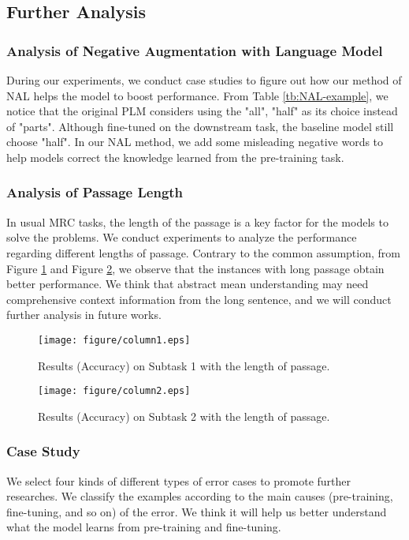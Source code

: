 \documentclass[11pt,a4paper]{article}
\begin{document}
\subsection{Further Analysis}
\label{sec:error-analysis}

\subsubsection{Analysis of Negative Augmentation with Language Model}
During our experiments, we conduct case studies to figure out how our method of NAL helps the model to boost performance.
From Table \ref{tb:NAL-example}, we notice that the original PLM considers using the "all", "half" as its choice instead of "parts".
Although fine-tuned on the downstream task, the baseline model still choose "half".
In our NAL method, we add some misleading negative words to help models correct the knowledge learned from the pre-training task.

\subsubsection{Analysis of Passage Length}
In usual MRC tasks, the length of the passage is a key factor for the models to solve the problems. We conduct experiments to analyze the performance regarding different lengths of passage. Contrary to the common assumption, from Figure \ref{fig:result1-length} and Figure \ref{fig:result2-length}, we observe that the instances with long passage obtain better performance. We think that abstract mean understanding may need comprehensive context information from the long sentence, and we will conduct further analysis in future works. 


\begin{figure}[h]
    \centering
    \texttt{[image: figure/column1.eps]}
    \caption{\label{font-table}Results (Accuracy) on  Subtask 1 with the length of passage.}
    \label{fig:result1-length}
\end{figure}

\begin{figure}[h]
    \centering
    \texttt{[image: figure/column2.eps]}
    \caption{\label{font-table}Results (Accuracy) on  Subtask 2 with the length of passage.}
    \label{fig:result2-length}
\end{figure}

\subsubsection{Case Study}
We select four kinds of different types of error cases to promote further researches.
We classify the examples according to the main causes (pre-training, fine-tuning, and so on) of the error.
We think it will help us better understand what the model learns from pre-training and fine-tuning.
\end{document}
